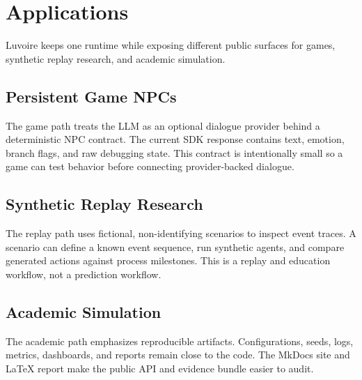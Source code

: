 \section{Applications}

Luvoire keeps one runtime while exposing different public surfaces for games, synthetic replay research, and academic simulation.

\subsection{Persistent Game NPCs}

The game path treats the LLM as an optional dialogue provider behind a deterministic NPC contract. The current SDK response contains text, emotion, branch flags, and raw debugging state. This contract is intentionally small so a game can test behavior before connecting provider-backed dialogue.

\subsection{Synthetic Replay Research}

The replay path uses fictional, non-identifying scenarios to inspect event traces. A scenario can define a known event sequence, run synthetic agents, and compare generated actions against process milestones. This is a replay and education workflow, not a prediction workflow.

\subsection{Academic Simulation}

The academic path emphasizes reproducible artifacts. Configurations, seeds, logs, metrics, dashboards, and reports remain close to the code. The MkDocs site and LaTeX report make the public API and evidence bundle easier to audit.


